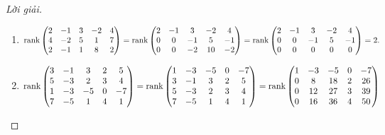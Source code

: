 \documentclass[class=linear-algebra,crop=false]{standalone}
\begin{document}
\begin{proof}[Lời giải]
	\begin{enumerate}[label = (\alph*)]
		\item
		      \begingroup{}
		      \allowdisplaybreaks{}
		      \begin{gather*}
			      \text{rank}\begin{pmatrix}
				      2 & -1 & 3 & -2 & 4 \\
				      4 & -2 & 5 & 1  & 7 \\
				      2 & -1 & 1 & 8  & 2
			      \end{pmatrix}
			      =\text{rank}\begin{pmatrix}
				      2 & -1 & 3  & -2 & 4  \\
				      0 & 0  & -1 & 5  & -1 \\
				      0 & 0  & -2 & 10 & -2
			      \end{pmatrix}
			      =\text{rank}\begin{pmatrix}
				      2 & -1 & 3  & -2 & 4  \\
				      0 & 0  & -1 & 5  & -1 \\
				      0 & 0  & 0  & 0  & 0
			      \end{pmatrix}
			      = 2.
		      \end{gather*}
		      \endgroup{}
		\item
		      \begingroup{}
		      \allowdisplaybreaks{}
		      \begin{gather*}
			      \text{rank}\begin{pmatrix}
				      3 & -1 & 3  & 2 & 5  \\
				      5 & -3 & 2  & 3 & 4  \\
				      1 & -3 & -5 & 0 & -7 \\
				      7 & -5 & 1  & 4 & 1
			      \end{pmatrix} =
			      \text{rank}\begin{pmatrix}
				      1 & -3 & -5 & 0 & -7 \\
				      3 & -1 & 3  & 2 & 5  \\
				      5 & -3 & 2  & 3 & 4  \\
				      7 & -5 & 1  & 4 & 1
			      \end{pmatrix} =
			      \text{rank}\begin{pmatrix}
				      1 & -3 & -5 & 0 & -7 \\
				      0 & 8  & 18 & 2 & 26 \\
				      0 & 12 & 27 & 3 & 39 \\
				      0 & 16 & 36 & 4 & 50

\end{pmatrix}
\end{gather*}
\end{enumerate}
\end{proof}
\end{document}
